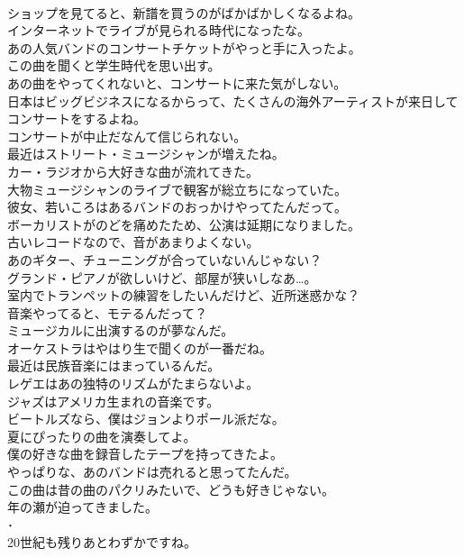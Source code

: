 \documentclass[8pt]{extreport}
\begin{document}
\begin{CJK}{UTF8}{min}
\\	ショップを見てると、新譜を買うのがばかばかしくなるよね。	
\\	インターネットでライブが見られる時代になったな。	
\\	あの人気バンドのコンサートチケットがやっと手に入ったよ。	
\\	この曲を聞くと学生時代を思い出す。	
\\	あの曲をやってくれないと、コンサートに来た気がしない。	
\\	日本はビッグビジネスになるからって、たくさんの海外アーティストが来日してコンサートをするよね。	
\\	コンサートが中止だなんて信じられない。	
\\	最近はストリート・ミュージシャンが増えたね。	
\\	カー・ラジオから大好きな曲が流れてきた。	
\\	大物ミュージシャンのライブで観客が総立ちになっていた。	
\\	彼女、若いころはあるバンドのおっかけやってたんだって。	
\\	ボーカリストがのどを痛めたため、公演は延期になりました。	
\\	古いレコードなので、音があまりよくない。	
\\	あのギター、チューニングが合っていないんじゃない？	
\\	グランド・ピアノが欲しいけど、部屋が狭いしなあ…。	
\\	室内でトランペットの練習をしたいんだけど、近所迷惑かな？	
\\	音楽やってると、モテるんだって？	
\\	ミュージカルに出演するのが夢なんだ。	
\\	オーケストラはやはり生で聞くのが一番だね。	
\\	最近は民族音楽にはまっているんだ。	
\\	レゲエはあの独特のリズムがたまらないよ。	
\\	ジャズはアメリカ生まれの音楽です。	
\\	ビートルズなら、僕はジョンよりポール派だな。	
\\	夏にぴったりの曲を演奏してよ。	
\\	僕の好きな曲を録音したテープを持ってきたよ。	
\\	やっぱりな、あのバンドは売れると思ってたんだ。	
\\	この曲は昔の曲のパクリみたいで、どうも好きじゃない。	
\\	年の瀬が迫ってきました。	
\\	･ 
\\	20世紀も残りあとわずかですね。	

\end{CJK}
\end{document}
